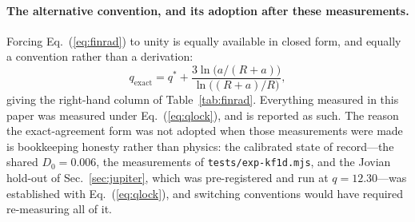 \documentclass[aps,reprint,amsmath,amssymb,nofootinbib,superscriptaddress,floatfix]{revtex4-2}
\begin{document}
\paragraph*{The alternative convention, and its adoption after these
  measurements.}
Forcing Eq.~(\ref{eq:finrad}) to unity is equally available in closed
form, and equally a convention rather than a derivation:
\begin{equation}
  q_{\mathrm{exact}} = q^{*}
    + \frac{3\ln\bigl(a/(R+a)\bigr)}{\ln\bigl((R+a)/R\bigr)} ,
  \label{eq:qexact}
\end{equation}
giving the right-hand column of Table~\ref{tab:finrad}.
Everything measured in this paper was measured under
Eq.~(\ref{eq:qlock}), and is reported as such.
The reason the exact-agreement form was not adopted when those
measurements were made is bookkeeping honesty rather than physics: the
calibrated state of record---the shared $D_0=0.006$, the measurements
of \texttt{tests/exp-kf1d.mjs}, and the Jovian hold-out of
Sec.~\ref{sec:jupiter}, which was pre-registered and run at
$q=12.30$---was established with Eq.~(\ref{eq:qlock}), and switching
conventions would have required re-measuring all of it.
\end{document}
